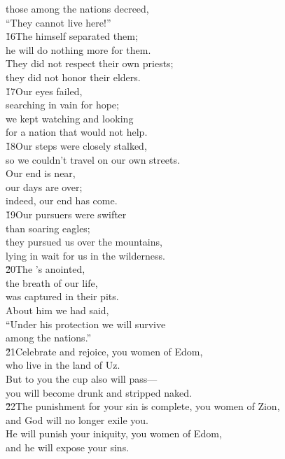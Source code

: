 \begin{poetry}
\poemll    those among the nations decreed, \\
\poemlll       ``They cannot live here!'' \\
\poeml \v{16}The  himself separated them; \\
\poemll    he will do nothing more for them. \\
\poeml They did not respect their own priests; \\
\poemll    they did not honor their elders. \\
\poeml \v{17}Our eyes failed, \\
\poemll    searching in vain for hope; \\
\poeml we kept watching and looking \\
\poemll    for a nation that would not help. \\
\poeml \v{18}Our steps were closely stalked, \\
\poemll    so we couldn't travel on our own streets. \\
\poeml Our end is near, \\
\poemll    our days are over; \\
\poemlll       indeed, our end has come. \\
\poeml \v{19}Our pursuers were swifter \\
\poemll    than soaring eagles; \\
\poeml they pursued us over the mountains, \\
\poemll    lying in wait for us in the wilderness. \\
\poeml \v{20}The 's anointed, \\
\poemll    the breath of our life, \\
\poemlll       was captured in their pits. \\
\poeml About him we had said, \\
\poemll    ``Under his protection we will survive \\
\poemlll       among the nations.'' \\
\poeml \v{21}Celebrate and rejoice, you women of Edom, \\
\poemll    who live in the land of Uz. \\
\poeml But to you the cup also will pass--- \\
\poemll    you will become drunk and stripped naked. \\
\poeml \v{22}The punishment for your sin is complete, you women of Zion, \\
\poemll    and God will no longer exile you. \\
\poeml He will punish your iniquity, you women of Edom, \\
\poemll    and he will expose your sins.
\end{poetry}

